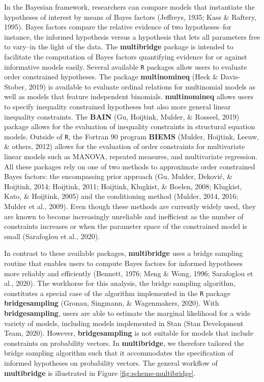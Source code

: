 \documentclass[
  english,
  man,floatsintext]{apa6}
\begin{document}
In the Bayesian framework, researchers can compare models that instantiate the hypotheses of interest by means of Bayes factors (Jeffreys, 1935; Kass \& Raftery, 1995). Bayes factors compare the relative evidence of two hypotheses--for instance, the informed hypothesis versus a hypothesis that lets all parameters free to vary--in the light of the data. The \textbf{multibridge} package is intended to facilitate the computation of Bayes factors quantifying evidence for or against informative models easily. Several available \texttt{R} packages allow users to evaluate order constrained hypotheses. The package \textbf{multinomineq} (Heck \& Davis-Stober, 2019) is available to evaluate ordinal relations for multinomial models as well as models that feature independent binomials. \textbf{multinomineq} allows users to specify inequality constrained hypotheses but also more general linear inequality constraints. The \textbf{BAIN} (Gu, Hoijtink, Mulder, \& Rosseel, 2019) package allows for the evaluation of inequality constraints in structural equation models. Outside of \texttt{R}, the Fortran 90 program \textbf{BIEMS} (Mulder, Hoijtink, Leeuw, \& others, 2012) allows for the evaluation of order constraints for multivariate linear models such as MANOVA, repeated measures, and multivariate regression. All these packages rely on one of two methods to approximate order constrained Bayes factors: the encompassing prior approach (Gu, Mulder, Deković, \& Hoijtink, 2014; Hoijtink, 2011; Hoijtink, Klugkist, \& Boelen, 2008; Klugkist, Kato, \& Hoijtink, 2005) and the conditioning method (Mulder, 2014, 2016; Mulder et al., 2009). Even though these methods are currently widely used, they are known to become increasingly unreliable and inefficient as the number of constraints increases or when the parameter space of the constrained model is small (Sarafoglou et al., 2020).

In contrast to these available packages, \textbf{multibridge} uses a bridge sampling routine that enables users to compute Bayes factors for informed hypotheses more reliably and efficiently (Bennett, 1976; Meng \& Wong, 1996; Sarafoglou et al., 2020). The workhorse for this analysis, the bridge sampling algorithm, constitutes a special case of the algorithm implemented in the \texttt{R} package \textbf{bridgesampling} (Gronau, Singmann, \& Wagenmakers, 2020). With \textbf{bridgesampling}, users are able to estimate the marginal likelihood for a wide variety of models, including models implemented in Stan (Stan Development Team, 2020). However, \textbf{bridgesampling} is not suitable for models that include constraints on probability vectors. In \textbf{multibridge}, we therefore tailored the bridge sampling algorithm such that it accommodates the specification of informed hypotheses on probability vectors. The general workflow of \textbf{multibridge} is illustrated in Figure \ref{fig:scheme-multibridge}.
\end{document}
